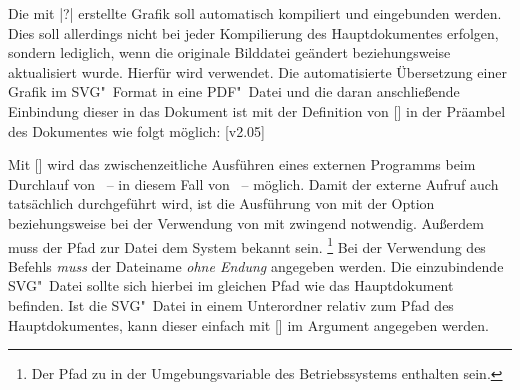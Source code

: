Die mit |?| erstellte Grafik soll automatisch kompiliert 
und eingebunden werden. Dies soll allerdings nicht bei jeder Kompilierung des 
Hauptdokumentes erfolgen, sondern lediglich, wenn die originale Bilddatei 
geändert beziehungsweise aktualisiert wurde. Hierfür wird  
verwendet. Die automatisierte Übersetzung einer Grafik im SVG"~Format in eine 
PDF"~Datei und die daran anschließende Einbindung dieser in das Dokument ist 
mit der Definition von [] 
in der Präambel des Dokumentes wie folgt möglich:
[v2.05]
%
\begin{Declaration*}{}
\begin{quoting}
\end{quoting}
\end{Declaration*}
%
Mit [] wird das 
zwischenzeitliche Ausführen eines externen Programms beim Durchlauf von 
~-- in diesem Fall von ~-- möglich. Damit 
der externe Aufruf auch tatsächlich durchgeführt wird, ist die Ausführung von 
 mit der Option  beziehungsweise bei 
der Verwendung von  mit  
zwingend notwendig. Außerdem muss der Pfad zur Datei  dem 
System bekannt sein.%
\footnote{%
  Der Pfad zu  in der Umgebungsvariable  des 
  Betriebssystems enthalten sein.
}
Bei der Verwendung des Befehls  \emph{muss} der Dateiname 
\emph{ohne Endung} angegeben werden. Die einzubindende SVG"~Datei sollte sich 
hierbei im gleichen Pfad wie das Hauptdokument befinden. Ist die SVG"~Datei in 
einem Unterordner relativ zum Pfad des Hauptdokumentes, kann dieser einfach mit 
[] im Argument 
angegeben werden.



